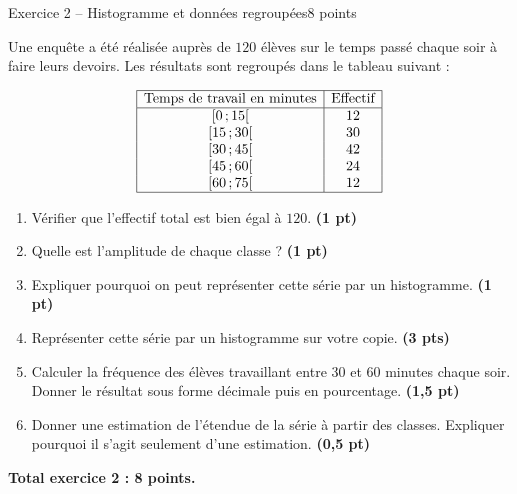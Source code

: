 \documentclass[11pt,a4paper]{article}
\newcommand{\pts}[1]{\hfill \textbf{(#1 pt)}}
\newcommand{\ptss}[1]{\hfill \textbf{(#1 pts)}}
\newcommand{\classe}[2]{\ensuremath{[#1\,;#2[}}
\begin{document}
\begin{exercicebox}{Exercice 2 -- Histogramme et données regroupées}{8 points}

Une enquête a été réalisée auprès de $120$ élèves sur le temps passé chaque soir à faire leurs devoirs. Les résultats sont regroupés dans le tableau suivant :

\[
\begin{array}{|c|c|}
\hline
\text{Temps de travail en minutes} & \text{Effectif} \\
\hline
\classe{0}{15} & 12 \\
\classe{15}{30} & 30 \\
\classe{30}{45} & 42 \\
\classe{45}{60} & 24 \\
\classe{60}{75} & 12 \\
\hline
\end{array}
\]

\begin{enumerate}
    \item Vérifier que l’effectif total est bien égal à $120$. \pts{1}

    \item Quelle est l’amplitude de chaque classe ? \pts{1}

    \item Expliquer pourquoi on peut représenter cette série par un histogramme. \pts{1}

    \item Représenter cette série par un histogramme sur votre copie. \ptss{3}

    \item Calculer la fréquence des élèves travaillant entre $30$ et $60$ minutes chaque soir. Donner le résultat sous forme décimale puis en pourcentage. \pts{1,5}

    \item Donner une estimation de l’étendue de la série à partir des classes. Expliquer pourquoi il s’agit seulement d’une estimation. \pts{0,5}
\end{enumerate}

\textbf{Total exercice 2 : 8 points.}

\end{exercicebox}
\end{document}
